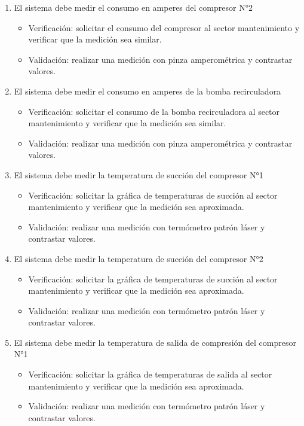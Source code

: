 \documentclass[
11pt, %
]{charter}
\begin{document}
\begin{enumerate}
\begin{enumerate}
\begin{itemize}
			\end{itemize}
			\item El sistema debe medir el consumo en amperes del compresor N°2
			\begin{itemize}
				\item Verificación: solicitar el consumo del compresor al sector mantenimiento y verificar que la medición sea similar.
				\item Validación: realizar una medición con pinza amperométrica y contrastar valores.
			\end{itemize}
			\item El sistema debe medir el consumo en amperes de la bomba recirculadora
			\begin{itemize}
				\item Verificación: solicitar el consumo de la bomba recirculadora al sector mantenimiento y verificar que la medición sea similar.
				\item Validación: realizar una medición con pinza amperométrica y contrastar valores.
			\end{itemize}
			\item El sistema debe medir la temperatura de succión del compresor N°1
			\begin{itemize}
				\item Verificación: solicitar la gráfica de temperaturas de succión al sector mantenimiento y verificar que la medición sea aproximada.
				\item Validación: realizar una medición con termómetro patrón láser y contrastar valores.
			\end{itemize}
			\item El sistema debe medir la temperatura de succión del compresor N°2
			\begin{itemize}
				\item Verificación: solicitar la gráfica de temperaturas de succión al sector mantenimiento y verificar que la medición sea aproximada.
				\item Validación: realizar una medición con termómetro patrón láser y contrastar valores.
			\end{itemize}
			\item El sistema debe medir la temperatura de salida de compresión del compresor N°1
			\begin{itemize}
				\item Verificación: solicitar la gráfica de temperaturas de salida al sector mantenimiento y verificar que la medición sea aproximada.
				\item Validación: realizar una medición con termómetro patrón láser y contrastar valores.

\end{itemize}
\end{enumerate}
\end{enumerate}
\end{document}
